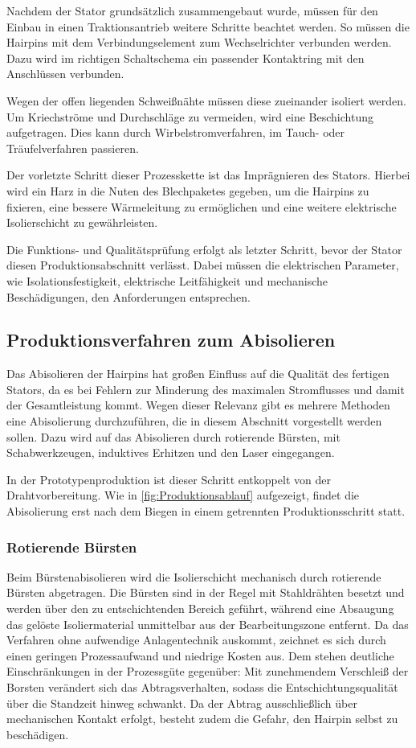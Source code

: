 Nachdem der Stator grundsätzlich zusammengebaut wurde, müssen für den Einbau in einen Traktionsantrieb weitere Schritte beachtet werden.
So müssen die Hairpins mit dem Verbindungselement zum Wechselrichter verbunden werden. Dazu wird im richtigen Schaltschema ein passender Kontaktring mit
den Anschlüssen verbunden.

Wegen der offen liegenden Schweißnähte müssen diese
zueinander isoliert werden. Um Kriechströme und Durchschläge zu vermeiden, wird eine Beschichtung aufgetragen.
Dies kann durch Wirbelstromverfahren, im Tauch- oder Träufelverfahren passieren.

Der vorletzte Schritt dieser Prozesskette ist das Imprägnieren des Stators. Hierbei wird ein Harz in die Nuten des Blechpaketes gegeben,
um die Hairpins zu fixieren, eine bessere Wärmeleitung zu ermöglichen und eine weitere elektrische Isolierschicht zu gewährleisten.

Die Funktions- und Qualitätsprüfung erfolgt als letzter Schritt, bevor der Stator diesen Produktionsabschnitt verlässt. Dabei müssen die
elektrischen Parameter, wie Isolationsfestigkeit, elektrische Leitfähigkeit und mechanische Beschädigungen, den Anforderungen entsprechen.
%
%
\subsection{Produktionsverfahren zum Abisolieren}\label{sec:ProduktionsverfahrenAbisolieren}
Das Abisolieren der Hairpins hat großen Einfluss auf die Qualität des fertigen Stators, da es bei Fehlern zur
Minderung des maximalen Stromflusses und damit der Gesamtleistung kommt. Wegen dieser Relevanz gibt es mehrere Methoden
eine Abisolierung durchzuführen, die in diesem Abschnitt vorgestellt werden sollen. Dazu wird auf das Abisolieren durch rotierende Bürsten,
mit Schabwerkzeugen, induktives Erhitzen und den Laser eingegangen.

In der Prototypenproduktion ist dieser Schritt entkoppelt von der Drahtvorbereitung. Wie in \cref{fig:Produktionsablauf}
aufgezeigt, findet die Abisolierung erst nach dem Biegen in einem getrennten Produktionsschritt statt.
%
\subsubsection{Rotierende Bürsten}\label{sec:RotierendeBuersten}
Beim Bürstenabisolieren wird die Isolierschicht mechanisch durch rotierende Bürsten
abgetragen. Die Bürsten sind in der Regel mit Stahldrähten besetzt und werden über
den zu entschichtenden Bereich geführt, während eine Absaugung das gelöste
Isoliermaterial unmittelbar aus der Bearbeitungszone entfernt. Da das Verfahren ohne
aufwendige Anlagentechnik auskommt, zeichnet es sich durch einen geringen
Prozessaufwand und niedrige Kosten aus. Dem stehen deutliche Einschränkungen in der
Prozessgüte gegenüber: Mit zunehmendem Verschleiß der Borsten verändert sich das
Abtragsverhalten, sodass die Entschichtungsqualität über die Standzeit hinweg
schwankt. Da der Abtrag ausschließlich über mechanischen Kontakt erfolgt, besteht
zudem die Gefahr, den Hairpin selbst zu beschädigen.
%
